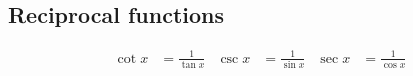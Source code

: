\subsection*{Reciprocal functions}

\begin{align*}
  \cot x &= \frac{1}{\tan x}
  &\csc x &= \frac{1}{\sin x}
  &\sec x &= \frac{1}{\cos x}
\end{align*}
